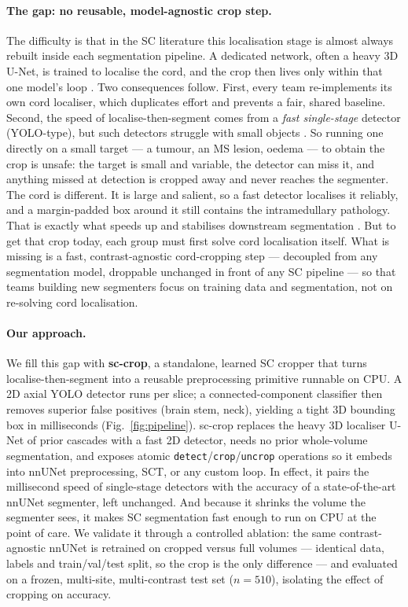 \documentclass[11pt]{article}
\begin{document}
\paragraph{The gap: no reusable, model-agnostic crop step.}
The difficulty is that in the SC literature this localisation stage is almost
always rebuilt inside each segmentation pipeline. A dedicated network, often a
heavy 3D U-Net, is trained to localise the cord, and the crop then lives only
within that one model's loop \cite{gros2019deepseg, lemay2021tumor, gros2021tumor}.
Two consequences follow. First, every team re-implements its own cord localiser,
which duplicates effort and prevents a fair, shared baseline. Second, the speed of
localise-then-segment comes from a \emph{fast single-stage} detector (YOLO-type),
but such detectors struggle with small objects \cite{sobek2024medyolo}. So running
one directly on a small target --- a tumour, an MS lesion, oedema --- to obtain the
crop is unsafe: the target is small and variable, the detector can miss it, and
anything missed at detection is cropped away and never reaches the segmenter. The
cord is different. It is large and salient, so a fast detector localises it
reliably, and a margin-padded box around it still contains the intramedullary
pathology. That is exactly what speeds up and stabilises downstream segmentation
\cite{lemay2021tumor}. But to get that crop today, each group must first solve cord
localisation itself. What is missing is a fast, contrast-agnostic cord-cropping
step --- decoupled from any segmentation model, droppable unchanged in front of any
SC pipeline --- so that teams building new segmenters focus on training data and
segmentation, not on re-solving cord localisation.

\paragraph{Our approach.}
We fill this gap with \textbf{sc-crop}, a standalone, learned SC cropper that turns
localise-then-segment into a reusable preprocessing primitive runnable on CPU. A 2D
axial YOLO detector \cite{} runs per slice; a connected-component classifier then
removes superior false positives (brain stem, neck), yielding a tight 3D bounding
box in milliseconds (Fig.~\ref{fig:pipeline}). sc-crop replaces the heavy 3D
localiser U-Net of prior cascades with a fast 2D detector, needs no prior
whole-volume segmentation, and exposes atomic
\texttt{detect}/\texttt{crop}/\texttt{uncrop} operations so it embeds into nnUNet
preprocessing, SCT, or any custom loop. In effect, it pairs the millisecond speed
of single-stage detectors with the accuracy of a state-of-the-art nnUNet
segmenter, left unchanged. And because it shrinks the volume the segmenter sees, it
makes SC segmentation fast enough to run on CPU at the point of care. We validate
it through a controlled ablation: the same contrast-agnostic nnUNet is retrained
on cropped versus full volumes --- identical data, labels and train/val/test split,
so the crop is the only difference --- and evaluated on a frozen, multi-site,
multi-contrast test set ($n=510$), isolating the effect of cropping on accuracy.
\end{document}
